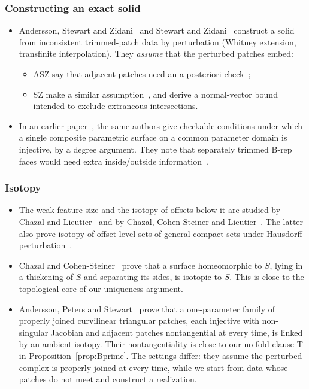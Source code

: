 \documentclass[preprint,12pt]{elsarticle}
\theoremstyle{definition}
\theoremstyle{remark}
\begin{document}
\subsubsection*{Constructing an exact solid}
\begin{itemize}
\item Andersson, Stewart and Zidani~\cite{ASZ07} and Stewart and Zidani~\cite{SZ08} construct a solid from
inconsistent trimmed-patch data by perturbation (Whitney extension, transfinite interpolation). They \emph{assume}
that the perturbed patches embed:
  \begin{itemize}
  \item ASZ say that adjacent patches need an a posteriori check~\cite[pp.~819--820]{ASZ07};
  \item SZ make a similar assumption~\cite[p.~188]{SZ08}, and derive a normal-vector bound intended to exclude
  extraneous intersections.
  \end{itemize}
\item In an earlier paper~\cite{ASZ06}, the same authors give checkable conditions under which a single composite
parametric surface on a common parameter domain is injective, by a degree argument. They note that separately
trimmed B-rep faces would need extra inside/outside information~\cite[\S3.7]{ASZ06}.
\end{itemize}

\subsubsection*{Isotopy}
\begin{itemize}
\item The weak feature size and the isotopy of offsets below it are studied by Chazal and
Lieutier~\cite{ChazalLieutier07} and by Chazal, Cohen-Steiner and Lieutier~\cite{CCSL09dcg}. The latter
also prove isotopy of offset level sets of general compact sets under Hausdorff
perturbation~\cite[Thms.~4.2,~4.3]{CCSL09cg}.
\item Chazal and Cohen-Steiner~\cite[Thm.~2.1]{CCS05} prove that a surface homeomorphic to $S$, lying in a thickening
of $S$ and separating its sides, is isotopic to $S$. This is close to the topological core of our uniqueness
argument.
\item Andersson, Peters and Stewart~\cite[Thm.~1]{APS00} prove that a one-parameter family of properly joined
curvilinear triangular patches, each injective with non-singular Jacobian and adjacent patches nontangential at every
time, is linked by an ambient isotopy. Their nontangentiality is close to our no-fold clause T in
Proposition~\ref{prop:Bprime}. The settings differ: they assume the perturbed complex is properly joined at every time,
while we start from data whose patches do not meet and construct a realization.
\end{itemize}
\end{document}
